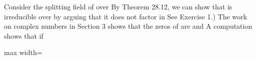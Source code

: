 \documentclass[11pt,oneside]{article}
\begin{document}
\begin{BookBody}
 Consider the splitting field of  over  By Theorem 28.12, we can show that  is irreducible over  by arguing that it does not factor in See Exercise 1.) The work on complex numbers in Section 3 shows that the zeros of  are \BookInline{(1\pm }  and  A computation shows that if

\begin{center}\begin{adjustbox}{max width=\linewidth}\end{adjustbox}\end{center}

\end{BookBody}

\BookNarrativetrue
\end{document}
